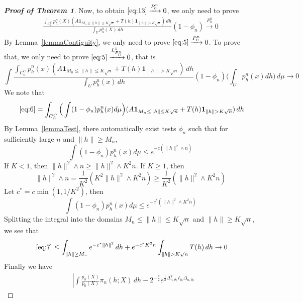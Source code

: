 \begin{proof}[\textbf{Proof of Theorem 1}]
Now, to obtain $\eqref{eq:13}\xrightarrow{P_0^n}0$, we only need to prove
\begin{equation}\label{eq:5}
    \begin{aligned}
        \frac{\int_{C_n^C}p_h^n(X)(A\textbf{1}_{M_n\leq \|h\|\leq K\sqrt{n}}+T(h)\textbf{1}_{\|h\|> K\sqrt{n}})\, dh}{\int_U p_h^n(X)\, dh}(1-\phi_n)\xrightarrow{P_0^n} 0
    \end{aligned}
\end{equation}
By Lemma~\ref{lemmaContiguity}, we only need to prove $\eqref{eq:5}\xrightarrow{P_U^n}0$. To prove that, we only need to prove $\eqref{eq:5}\xrightarrow{L^1_{P_U^n}}0$, that is 
\begin{equation}\label{eq:6}
    \int \frac{\int_{C_n^C}p_h^n(x)(A\textbf{1}_{M_n\leq \|h\|\leq K\sqrt{n}}+T(h)\textbf{1}_{\|h\|> K\sqrt{n}})\, dh}{\int_U p_h^n(x)\, dh}(1-\phi_n)\big(\int_U p_h^n(x)dh\big) \, d\mu  \to 0
\end{equation}
We note that
\begin{equation}\label{eq:7}~\eqref{eq:6}=\int_{C_n^C} \Big(\int (1-\phi_n)p_h^n(x)d\mu\Big) (A\textbf{1}_{M_n\leq \|h\|\leq K\sqrt{n}}+T(h)\textbf{1}_{\|h\|> K\sqrt{n}})\, dh 
\end{equation}
By Lemma~\ref{lemmaTest}, there automatically exist tests $\phi_n$  such that for sufficiently large $n$ and $\|h\|\geq M_n$,
\begin{equation}
\int (1-\phi_n)p^n_h(x)d\mu\leq e^{-c(\|h\|^2\wedge n)}
\end{equation}
If $K< 1$, then $\|h\|^2\wedge n\geq \|h\|^2\wedge K^2n$. If $K\geq 1$, then
\begin{equation}
    \|h\|^2\wedge n=\frac{1}{K^2}(K^2\|h\|^2\wedge K^2n)\geq \frac{1}{K^2}(\|h\|^2\wedge K^2n)
\end{equation}
Let $c^*=c\min(1,1/K^2)$, then
\begin{equation}
\int (1-\phi_n)p^n_h(x)d\mu\leq e^{-c^*(\|h\|^2\wedge K^2n)}
\end{equation}
Splitting the integral into the domains $M_n\leq \|h\|\leq K\sqrt{n}$ and $\|h\|\geq K\sqrt{n}$, we see that
\begin{equation}~\eqref{eq:7}\leq \int_{\|h\|\geq M_n}e^{-c^*\|h\|^2}\, dh + e^{-c^*K^2n}\int_{\|h\|>K\sqrt{n}} T(h)\, dh  \to 0
\end{equation}
Finally we have
\begin{equation}
    \begin{aligned}
        &\left|\int \frac{p_h(X)}{p_0(X)}\pi_n (h;X) \, dh-2^{-\frac{p}{2}}e^{\frac{1}{2}\Delta_{n,\theta_0}^T I_{\theta_0}\Delta_{n,\theta_0}}

\end{aligned}
\end{equation}
\end{proof}

